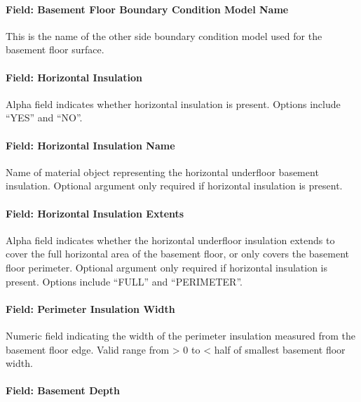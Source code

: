 \paragraph{Field: Basement Floor Boundary Condition Model Name}\label{field-basement-floor-boundary-condition-model-name}

This is the name of the other side boundary condition model used for the basement floor surface.

\paragraph{Field: Horizontal Insulation}\label{field-horizontal-insulation-1}

Alpha field indicates whether horizontal insulation is present. Options include ``YES'' and ``NO''.

\paragraph{Field: Horizontal Insulation Name}\label{field-horizontal-insulation-name}

Name of material object representing the horizontal underfloor basement insulation. Optional argument only required if horizontal insulation is present.

\paragraph{Field: Horizontal Insulation Extents}\label{field-horizontal-insulation-extents-1}

Alpha field indicates whether the horizontal underfloor insulation extends to cover the full horizontal area of the basement floor, or only covers the basement floor perimeter. Optional argument only required if horizontal insulation is present. Options include ``FULL'' and ``PERIMETER''.

\paragraph{Field: Perimeter Insulation Width}\label{field-perimeter-insulation-width-1}

Numeric field indicating the width of the perimeter insulation measured from the basement floor edge. Valid range from \textgreater{} 0 to \textless{} half of smallest basement floor width.

\paragraph{Field: Basement Depth}\label{field-basement-depth}

